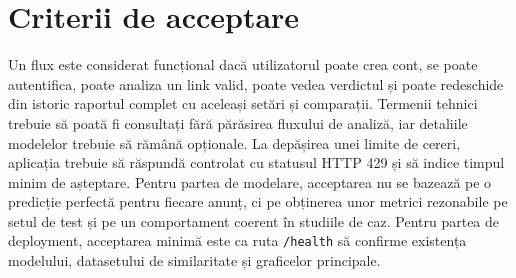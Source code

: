 \section{Criterii de acceptare}
\label{sec:req-acceptance}

Un flux este considerat funcțional dacă utilizatorul poate crea cont, se poate autentifica, poate analiza un link valid, poate vedea verdictul și poate redeschide din istoric raportul complet cu aceleași setări și comparații. Termenii tehnici trebuie să poată fi consultați fără părăsirea fluxului de analiză, iar detaliile modelelor trebuie să rămână opționale. La depășirea unei limite de cereri, aplicația trebuie să răspundă controlat cu statusul HTTP 429 și să indice timpul minim de așteptare. Pentru partea de modelare, acceptarea nu se bazează pe o predicție perfectă pentru fiecare anunț, ci pe obținerea unor metrici rezonabile pe setul de test și pe un comportament coerent în studiile de caz. Pentru partea de deployment, acceptarea minimă este ca ruta \texttt{/health} să confirme existența modelului, datasetului de similaritate și graficelor principale.

